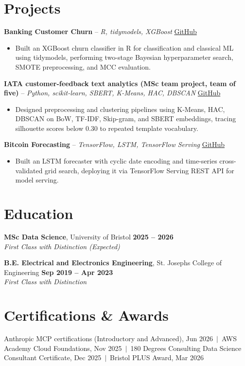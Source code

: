 \documentclass[a4paper,11pt]{article}
\begin{document}
\section{Projects}
\noindent\textbf{Banking Customer Churn} -- \textit{R, tidymodels, XGBoost} \hfill \href{https://github.com/Thiruvel-AP/Banking-Customer-Churn-Prediction}{GitHub}
\begin{itemize}
  \item Built an XGBoost churn classifier in R for classification and classical ML using tidymodels, performing two-stage Bayesian hyperparameter search, SMOTE preprocessing, and MCC evaluation.
\end{itemize}
\vspace{3pt}
\noindent\textbf{IATA customer-feedback text analytics (MSc team project, team of five)} -- \textit{Python, scikit-learn, SBERT, K-Means, HAC, DBSCAN} \hfill \href{https://github.com/Thiruvel-AP/TextAnalytics}{GitHub}
\begin{itemize}
  \item Designed preprocessing and clustering pipelines using K-Means, HAC, DBSCAN on BoW, TF-IDF, Skip-gram, and SBERT embeddings, tracing silhouette scores below 0.30 to repeated template vocabulary.
\end{itemize}
\vspace{3pt}
\noindent\textbf{Bitcoin Forecasting} -- \textit{TensorFlow, LSTM, TensorFlow Serving} \hfill \href{https://github.com/Thiruvel-AP/BitcoinForecasting}{GitHub}
\begin{itemize}
  \item Built an LSTM forecaster with cyclic date encoding and time-series cross-validated grid search, deploying it via TensorFlow Serving REST API for model serving.
\end{itemize}

\section{Education}
\textbf{MSc Data Science}, University of Bristol \hfill \textbf{2025 – 2026}\\ \textit{First Class with Distinction (Expected)}\par
\vspace{3pt}
\textbf{B.E. Electrical and Electronics Engineering}, St. Joseph\textquotesingle{}s College of Engineering \hfill \textbf{Sep 2019 – Apr 2023}\\ \textit{First Class with Distinction}\par

\section{Certifications \& Awards}
Anthropic MCP certifications (Introductory and Advanced), Jun 2026 \,$|$\, AWS Academy Cloud Foundations, Nov 2025 \,$|$\, 180 Degrees Consulting Data Science Consultant Certificate, Dec 2025 \,$|$\, Bristol PLUS Award, Mar 2026
\end{document}
